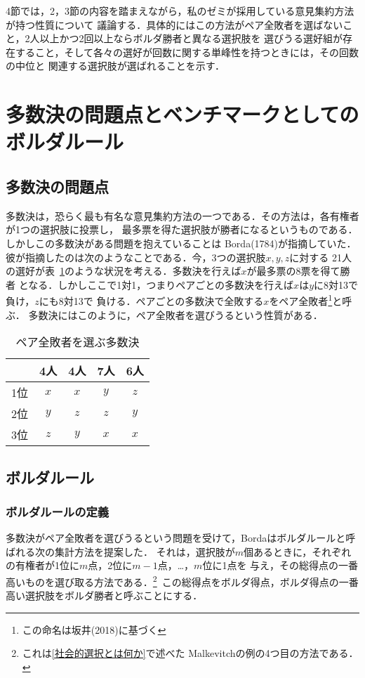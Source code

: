 \documentclass[dvipdfmx]{jsarticle}
\begin{document}
4節では，2，3節の内容を踏まえながら，私のゼミが採用している意見集約方法が持つ性質について
議論する．具体的にはこの方法がペア全敗者を選ばないこと，2人以上かつ2回以上ならボルダ勝者と異なる選択肢を
選びうる選好組が存在すること，そして各々の選好が回数に関する単峰性を持つときには，その回数の中位と
関連する選択肢が選ばれることを示す．

\section{多数決の問題点とベンチマークとしてのボルダルール}
\subsection{多数決の問題点}
多数決は，恐らく最も有名な意見集約方法の一つである．その方法は，各有権者が1つの選択肢に投票し，
最多票を得た選択肢が勝者になるというものである．しかしこの多数決がある問題を抱えていることは
Borda(1784)が指摘していた．彼が指摘したのは次のようなことである．今，3つの選択肢$x,y,z$に対する
21人の選好が表~\ref{ペア全敗者}のような状況を考える．多数決を行えば$x$が最多票の8票を得て勝者
となる．しかしここで1対1，つまりペアごとの多数決を行えば$x$は$y$に8対13で負け，$z$にも8対13で
負ける．ペアごとの多数決で全敗する$x$をペア全敗者\footnote{この命名は坂井(2018)に基づく}と呼ぶ．
多数決にはこのように，ペア全敗者を選びうるという性質がある．

\begin{table}[h]
  \caption{ペア全敗者を選ぶ多数決}\label{ペア全敗者}
  \begin{center}
    \begin{tabular}{c|c|c|c|c} \hline
      & 4人 & 4人 & 7人 & 6人 \\ \hline
      1位 & $x$ & $x$ & $y$ & $z$ \\
      2位 & $y$ & $z$ & $z$ & $y$ \\
      3位 & $z$ & $y$ & $x$ & $x$ \\ \hline 
    \end{tabular}
  \end{center}
\end{table}



\subsection{ボルダルール}
\subsubsection{ボルダルールの定義}
多数決がペア全敗者を選びうるという問題を受けて，Bordaはボルダルールと呼ばれる次の集計方法を提案した．
それは，選択肢が$m$個あるときに，それぞれの有権者が1位に$m$点，2位に$m-1$点，\ldots，$m$位に1点を
与え，その総得点の一番高いものを選び取る方法である．\<\footnote{これは\ref{社会的選択とは何か}で述べた
Malkevitchの例の4つ目の方法である．}\ 
この総得点をボルダ得点，ボルダ得点の一番高い選択肢をボルダ勝者と呼ぶことにする．
\end{document}
